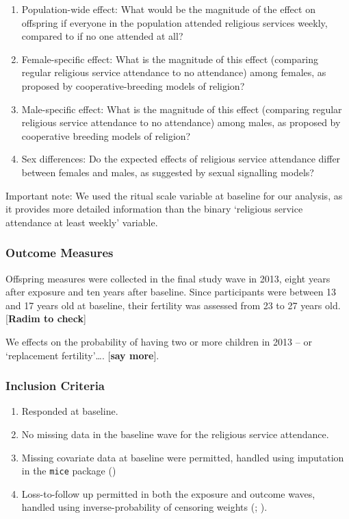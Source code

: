 \documentclass[
  single column]{article}
\providecommand{\tightlist}{%
  \setlength{\itemsep}{0pt}\setlength{\parskip}{0pt}}\usepackage{longtable,booktabs,array}
\begin{document}
\begin{enumerate}
\def\labelenumi{\arabic{enumi}.}
\item
  Population-wide effect: What would be the magnitude of the effect on
  offspring if everyone in the population attended religious services
  weekly, compared to if no one attended at all?
\item
  Female-specific effect: What is the magnitude of this effect
  (comparing regular religious service attendance to no attendance)
  among females, as proposed by cooperative-breeding models of religion?
\item
  Male-specific effect: What is the magnitude of this effect (comparing
  regular religious service attendance to no attendance) among males, as
  proposed by cooperative breeding models of religion?
\item
  Sex differences: Do the expected effects of religious service
  attendance differ between females and males, as suggested by sexual
  signalling models?
\end{enumerate}

Important note: We used the ritual scale variable at baseline for our
analysis, as it provides more detailed information than the binary
`religious service attendance at least weekly' variable.

\subsubsection{Outcome Measures}\label{outcome-measures}

Offspring measures were collected in the final study wave in 2013, eight
years after exposure and ten years after baseline. Since participants
were between 13 and 17 years old at baseline, their fertility was
assessed from 23 to 27 years old. {[}\textbf{Radim to check}{]}

We effects on the probability of having two or more children in 2013 --
or `replacement fertility'\ldots. {[}\textbf{say more}{]}.

\subsubsection{Inclusion Criteria}\label{inclusion-criteria}

\begin{enumerate}
\def\labelenumi{\arabic{enumi}.}
\tightlist
\item
  Responded at baseline.
\item
  No missing data in the baseline wave for the religious service
  attendance.
\item
  Missing covariate data at baseline were permitted, handled using
  imputation in the \texttt{mice} package
  ()
\item
  Loss-to-follow up permitted in both the exposure and outcome waves,
  handled using inverse-probability of censoring weights
  (;
  ).
\end{enumerate}
\end{document}
